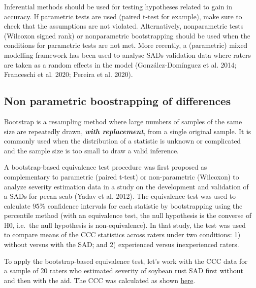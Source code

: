 \documentclass[
  letterpaper,
  DIV=11,
  numbers=noendperiod]{scrreprt}
\begin{document}
Inferential methods should be used for testing hypotheses related to
gain in accuracy. If parametric tests are used (paired t-test for
example), make sure to check that the assumptions are not violated.
Alternatively, nonparametric tests (Wilcoxon signed rank) or
nonparametric bootstrapping should be used when the conditions for
parametric tests are not met. More recently, a (parametric) mixed
modelling framework has been used to analyse SADs validation data where
raters are taken as a random effects in the model (González-Domínguez et
al. 2014; Franceschi et al. 2020; Pereira et al. 2020).

\hypertarget{non-parametric-boostrapping-of-differences}{%
\subsection{Non parametric boostrapping of
differences}\label{non-parametric-boostrapping-of-differences}}

Bootstrap is a resampling method where large numbers of samples of the
same size are repeatedly drawn, \textbf{\emph{with replacement}}, from a
single original sample. It is commonly used when the distribution of a
statistic is unknown or complicated and the sample size is too small to
draw a valid inference.

A bootstrap-based equivalence test procedure was first proposed as
complementary to parametric (paired t-test) or non-parametric (Wilcoxon)
to analyze severity estimation data in a study on the development and
validation of a SADs for pecan scab (Yadav et al. 2012). The equivalence
test was used to calculate 95\% confidence intervals for each statistic
by bootstrapping using the percentile method (with an equivalence test,
the null hypothesis is the converse of H0, i.e.~the null hypothesis is
non-equivalence). In that study, the test was used to compare means of
the CCC statistics across raters under two conditions: 1) without versus
with the SAD; and 2) experienced versus inexperienced raters.

To apply the bootstrap-based equivalence test, let's work with the CCC
data for a sample of 20 raters who estimated severity of soybean rust
SAD first without and then with the aid. The CCC was calculated as shown
\protect\hyperlink{concordance-correlation-coefficient}{here}.
\end{document}
